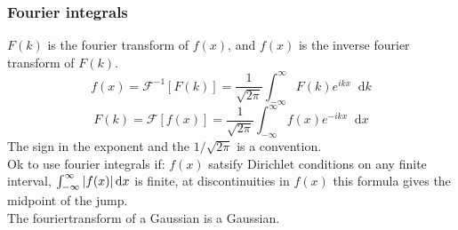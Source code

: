 \documentclass[a4paper, 10pt]{article}
\newcommand*\diff{\mathop{}\!\mathrm{d}}
\begin{document}
\begin{multicols*}{3}
\subsubsection*{\small Fourier integrals}
$F(k)$ is the fourier transform of $f(x)$, and $f(x)$ is the inverse fourier transform of $F(k)$.
$$ f(x) = \mathcal{F}^{-1}\left[ F(k) \right] = \frac{1}{\sqrt{2\pi}} \int_{-\infty}^{\infty} F(k) e^{ikx} \diff k $$
$$ F(k) = \mathcal{F}\left[ f(x) \right] = \frac{1}{\sqrt{2\pi}} \int_{-\infty}^{\infty} f(x) e^{-ik x} \diff x$$
The sign in the exponent and the $1/\sqrt{2\pi}$ is a convention.\\
Ok to use fourier integrals if: $f(x)$ satsify Dirichlet conditions on any finite interval, $\int_{-\infty}^{\infty} \abs{f(x)} \diff x$ is finite, at discontinuities in $f(x)$ this formula gives the midpoint of the jump.\\
The fouriertransform of a Gaussian is a Gaussian.\\





\end{multicols*}
\end{document}
